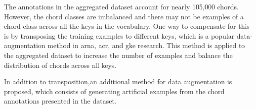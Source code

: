 
The annotations in the aggregated dataset account for nearly
105,000 chords. However, the chord classes are imbalanced
and there may not be examples of a chord class across all
the keys in the vocabulary. One way to compensate for this
is by transposing the training examples to different keys,
which is a popular data-augmentation method in \gls{arna},
\gls{acr}, and \gls{gke} research. This method is applied to
the aggregated dataset to increase the number of examples
and balance the distribution of chords across all keys.

In addition to transposition,an additional method for data
augmentation is proposed, which consists of generating
artificial examples from the chord annotations presented in
the dataset.
